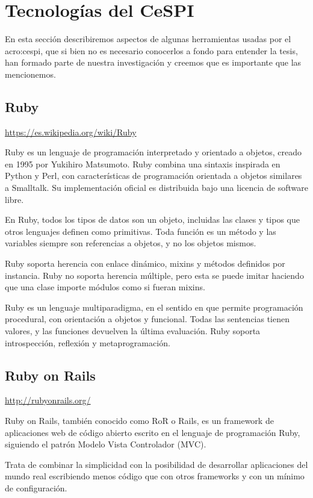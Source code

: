 \section{Tecnologías del CeSPI}
\label{anexo:A}

En esta sección describiremos aspectos de algunas herramientas usadas por el
\gls{acro:cespi}, que si bien no es necesario conocerlos a fondo para entender
la tesis, han formado parte de nuestra investigación y creemos que es
importante que las mencionemos.

\subsection{Ruby}
\url{https://es.wikipedia.org/wiki/Ruby}

Ruby es un lenguaje de programación interpretado y orientado a objetos, creado
en 1995 por Yukihiro Matsumoto. Ruby combina una sintaxis inspirada en Python y
Perl, con características de programación orientada a objetos similares a
Smalltalk. Su implementación oficial es distribuida bajo una licencia de
software libre.

En Ruby, todos los tipos de datos son un objeto, incluidas las clases y tipos
que otros lenguajes definen como primitivas. Toda función es un método y las
variables siempre son referencias a objetos, y no los objetos mismos.

Ruby soporta herencia con enlace dinámico, mixins y métodos definidos por
instancia. Ruby no soporta herencia múltiple, pero esta se puede imitar
haciendo que una clase importe módulos como si fueran mixins.

Ruby es un lenguaje multiparadigma, en el sentido en que permite programación
procedural, con orientación a objetos y funcional. Todas las sentencias tienen
valores, y las funciones devuelven la última evaluación. Ruby soporta
introspección, reflexión y metaprogramación.

\subsection{Ruby on Rails}
\url{http://rubyonrails.org/}

Ruby on Rails, también conocido como RoR o Rails, es un framework de
aplicaciones web de código abierto escrito en el lenguaje de programación Ruby,
siguiendo el patrón Modelo Vista Controlador (MVC).

Trata de combinar la simplicidad con la posibilidad de desarrollar aplicaciones
del mundo real escribiendo menos código que con otros frameworks y con un
mínimo de configuración.


